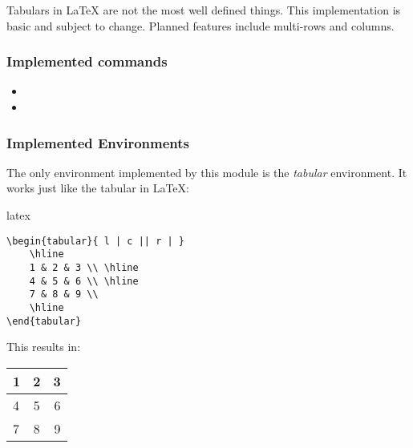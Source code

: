 \begin{paragraph}
    Tabulars in LaTeX are not the most well defined things. This implementation is basic and subject to change. Planned features include multi-rows and columns.
\end{paragraph}

\subsubsection{Implemented commands}
\begin{itemize}
    \item{}
    \item{}
\end{itemize}

\subsubsection{Implemented Environments}
The only environment implemented by this module is the \textit{tabular} environment. It works just like the tabular in LaTeX:\\
\begin{code}{latex}
\begin{verbatim}
\begin{tabular}{ l | c || r | }
    \hline
    1 & 2 & 3 \\ \hline
    4 & 5 & 6 \\ \hline
    7 & 8 & 9 \\
    \hline
\end{tabular}
\end{verbatim}
\end{code}
This results in:
\begin{tabular}{ l | c || r | }
    \hline
    1 & 2 & 3 \\ \hline
    4 & 5 & 6 \\ \hline
    7 & 8 & 9 \\
    \hline
\end{tabular}